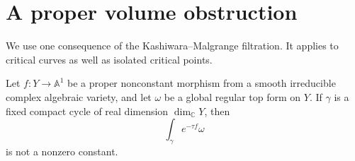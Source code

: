 \section{A proper volume obstruction}\label{sec:proper-volume}

We use one consequence of the Kashiwara--Malgrange filtration. It applies
to critical curves as well as isolated critical points.

\begin{lemma}\label{lem:proper-volume}
Let \(f:Y\to\mathbb A^1\) be a proper nonconstant morphism from a smooth
irreducible complex algebraic variety, and let \(\omega\) be a global
regular top form on \(Y\). If \(\gamma\) is a fixed compact cycle of real
dimension \(\dim_{\mathbb C}Y\), then
\[
 \int_\gamma e^{-\tau f}\omega
\]
is not a nonzero constant.
\end{lemma}

